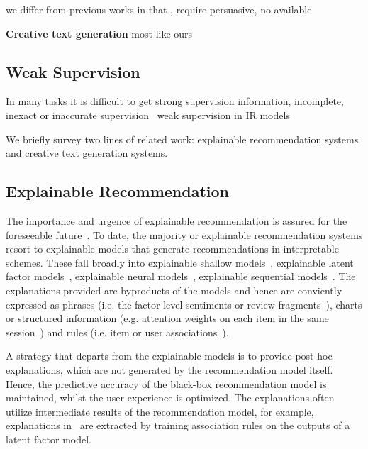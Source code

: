 \documentclass[sigconf]{acmart}
\begin{document}
we differ from previous works in that ,  require persuasive, no available 

\textbf{Creative text generation}
most like ours~\cite{Munigala2018PersuAIDE}
\subsection{Weak Supervision}
In many tasks it is difficult to get strong supervision information, incomplete, inexact or inaccurate supervision~\cite{Zhou2018brief}
weak supervision in IR models~\cite{}


We briefly survey two lines of related work: explainable recommendation systems and creative text generation systems.
\subsection{Explainable Recommendation}
The importance and urgence of explainable recommendation is assured for the foreseeable future~\cite{Zhang2018SIGIR}. To date, the majority or explainable recommendation systems resort to explainable models that generate recommendations in interpretable schemes. These fall broadly into explainable shallow models~\cite{vig2009tagsplanations,sigurbjornsson2008flickr}, explainable latent factor models~\cite{Zhang2014Explicit,Zhang2015Daily,Wu2015FLAME}, explainable neural models~\cite{Chen2018Neural}, explainable sequential models~\cite{Chen2018Sequential}. The explanations provided are byproducts of the models and hence are conviently expressed as phrases (i.e. the factor-level sentiments or review fragments~\cite{Zhang2014Explicit,Zhang2015Daily,Wu2015FLAME}), charts or structured information (e.g. attention weights on each item in the same session~\cite{Chen2018Neural}) and rules (i.e. item or user associations~\cite{vig2009tagsplanations,sigurbjornsson2008flickr}).   


A strategy that departs from the explainable models is to provide post-hoc explanations, which are not generated by the recommendation model itself. Hence, the predictive accuracy of the black-box recommendation model is maintained, whilst the user experience is optimized. The explanations often utilize intermediate results of the recommendation model, for example, explanations in~\cite{Peake2018Explanation} are extracted by training association rules on the outputs of a latent factor model.
\end{document}
